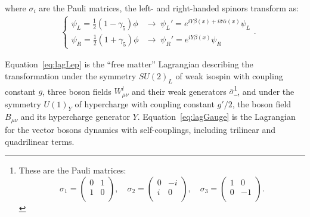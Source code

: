 where $\sigma_{i}$ are the Pauli matrices, the left- and right-handed spinors transform as:
\begin{align}
&\left \{ \begin{array}{ll}
\psi_{L} = \frac{1}{2}(1 - \gamma_{5})\phi &\rightarrow \; \psi_{L}' = e^{iY\beta(x) + i\bar{\sigma}\bar{\alpha}(x)}\psi_{L} \\
\psi_{R} = \frac{1}{2}(1 + \gamma_{5})\phi &\rightarrow \; \psi_{R}' = e^{iY\beta(x)}\psi_{R}
\end{array} \right. .
\label{eq:chiral}
\end{align}

Equation~\ref{eq:lagLep} is the ``free matter'' Lagrangian 
describing the transformation under the symmetry $SU(2)_{L}$ of weak isospin
with coupling constant $g$, three boson fields $W^{l}_{\mu\nu}$ and
their weak generators $\bar{\sigma}$\footnote{These are the Pauli matrices: 
$$
\sigma_{1} = \left(\begin{array}{cc} 0 & 1 \\ 1 & 0 \\ \end{array}\right), \quad
\sigma_{2} = \left(\begin{array}{cc} 0 & -i \\ i & 0 \\ \end{array}\right), \quad
\sigma_{3} = \left(\begin{array}{cc} 1 & 0 \\ 0 & -1 \\ \end{array}\right).
$$}, and under the symmetry
$U(1)_{Y}$ of hypercharge with coupling constant $g'/2$,
the boson field $B_{\mu\nu}$ and its hypercharge generator $Y$.
Equation~\ref{eq:lagGauge} is the Lagrangian for the vector bosons 
dynamics with self-couplings, including trilinear and quadrilinear terms. 



